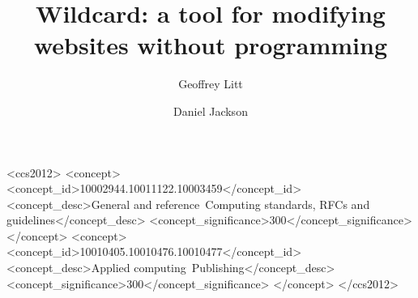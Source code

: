 \documentclass[english,submission]{programming}
\begin{document}
\title{Wildcard: a tool for modifying websites without programming}
\subtitle{}%

\author{Geoffrey Litt}
\author{Daniel Jackson}





\begin{CCSXML}
<ccs2012>
<concept>
<concept_id>10002944.10011122.10003459</concept_id>
<concept_desc>General and reference~Computing standards, RFCs and guidelines</concept_desc>
<concept_significance>300</concept_significance>
</concept>
<concept>
<concept_id>10010405.10010476.10010477</concept_id>
<concept_desc>Applied computing~Publishing</concept_desc>
<concept_significance>300</concept_significance>
</concept>
</ccs2012>
\end{CCSXML}



\maketitle
\end{document}
